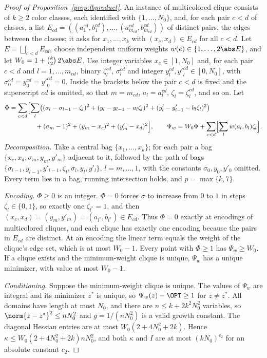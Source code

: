 \begin{proof}[Proof of Proposition~\ref{prop:lbproduct}]
An instance of multicolored clique consists of $k\ge2$ color classes, each
identified with $\{1,\dots,N_0\}$, and, for each pair $c<d$ of classes, a
list $E_{cd}=((a^{cd}_1,b^{cd}_1),\dots,(a^{cd}_{m_{cd}},b^{cd}_{m_{cd}}))$
of distinct pairs, the edges between the classes; it asks for
$x_1,\dots,x_k$ with $(x_c,x_d)\in E_{cd}$ for all $c<d$. Let
$E=\bigsqcup_{c<d}E_{cd}$, choose independent uniform weights
$w(e)\in\{1,\dots,2\abs E\}$, and let $W_0=1+\binom k2\,2\abs E$. Use integer
variables $x_c\in[1,N_0]$ and, for each pair $c<d$ and $l=1,\dots,m_{cd}$,
binary $\zeta^{cd}_l$, $\sigma^{cd}_l$ and integer
$y^{cd}_l,{y'}^{cd}_l\in[0,N_0]$, with $\sigma^{cd}_0=y^{cd}_0={y'}^{cd}_0=0$.
Inside the brackets below the pair $c<d$ is fixed and the superscript $cd$
is omitted, so that $m=m_{cd}$, $a_l=a^{cd}_l$, $\zeta_l=\zeta^{cd}_l$, and so
on. Let
\begin{align*}
\Phi&=\sum_{c<d}\Bigl[\sum_{l}\bigl((\sigma_l-\sigma_{l-1}-\zeta_l)^2
+(y_l-y_{l-1}-a_l\zeta_l)^2+(y'_l-y'_{l-1}-b_l\zeta_l)^2\bigr)\\
&\qquad\qquad+(\sigma_m-1)^2+(y_m-x_c)^2+(y'_m-x_d)^2\Bigr],\qquad
\Psi_w=W_0\Phi+\sum_{c<d}\Bigl[\sum_lw(a_l,b_l)\zeta_l\Bigr] .
\end{align*}
\emph{Decomposition.} Take a central bag $\{x_1,\dots,x_k\}$; for each pair a
bag $\{x_c,x_d,\sigma_m,y_m,y'_m\}$ adjacent to it, followed by the path of
bags $\{\sigma_{l-1},y_{l-1},y'_{l-1},\zeta_l,\sigma_l,y_l,y'_l\}$,
$l=m,\dots,1$, with the constants $\sigma_0,y_0,y'_0$ omitted. Every term lies
in a bag, running intersection holds, and $p=\max\{k,7\}$.

\emph{Encoding.} $\Phi\ge0$ is an integer. $\Phi=0$ forces $\sigma$ to
increase from $0$ to $1$ in steps $\zeta_l\in\{0,1\}$, so exactly one
$\zeta_{l^*}=1$, and then $(x_c,x_d)=(y_m,y'_m)=(a_{l^*},b_{l^*})\in E_{cd}$.
Thus $\Phi=0$ exactly at encodings of multicolored cliques, and each clique has
exactly one encoding because the pairs in $E_{cd}$ are distinct. At an
encoding the linear term equals the weight of the clique's edge set, which is
at most $W_0-1$. Every point with $\Phi\ge1$ has $\Psi_w\ge W_0$. If a clique
exists and the minimum-weight clique is unique, $\Psi_w$ has a unique
minimizer, with value at most $W_0-1$.

\emph{Conditioning.} Suppose the minimum-weight clique is unique. The values
of $\Psi_w$ are integral and its minimizer $z^*$ is unique, so
$\Psi_w(z)-\OPT\ge1$ for $z\ne z^*$. All domains have length at most $N_0$,
and there are $n\le k+2k^2N_0^2$ variables, so
$\norm{z-z^*}^2\le nN_0^2$ and $g=1/(nN_0^2)$ is a valid growth constant.
The diagonal Hessian entries are at most $W_0(2+4N_0^2+2k)$. Hence
$\kappa\le W_0(2+4N_0^2+2k)nN_0^2$, and both $\kappa$ and $I$ are at most
$(kN_0)^{c_2}$ for an absolute constant $c_2$.


\end{proof}
